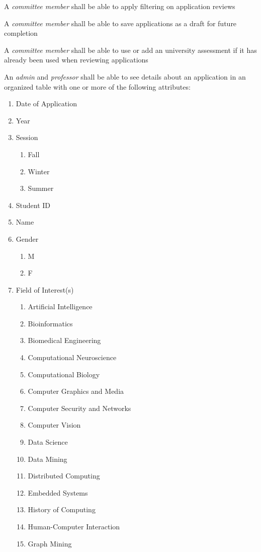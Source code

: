 \documentclass[fontsize=12pt,paper=letter,twoside]{scrartcl}
\begin{document}
\begin{mylist}
\item A \emph{committee member} shall be able to apply filtering on application reviews
\item A \emph{committee member} shall be able to save applications as a draft for future completion
\item A \emph{committee member} shall be able to use or add an university assessment if it has already been used when reviewing applications
\item An \emph{admin} and \emph{professor} shall be able to see details about an application in an organized table with one or more of the following attributes:
\begin{enumerate}
\item Date of Application
\item Year
\item Session
\begin{enumerate}
\item Fall
\item Winter
\item Summer
\end{enumerate}
\item Student ID
\item Name
\item Gender
\begin{enumerate}
\item M
\item F
\end{enumerate}
\item Field of Interest(s)
\begin{enumerate}
\item Artificial Intelligence
\item Bioinformatics
\item Biomedical Engineering
\item Computational Neuroscience
\item Computational Biology
\item Computer Graphics and Media
\item Computer Security and Networks
\item Computer Vision
\item Data Science
\item Data Mining
\item Distributed Computing
\item Embedded Systems
\item History of Computing
\item Human-Computer Interaction
\item Graph Mining

\end{enumerate}
\end{enumerate}
\end{mylist}
\end{document}
